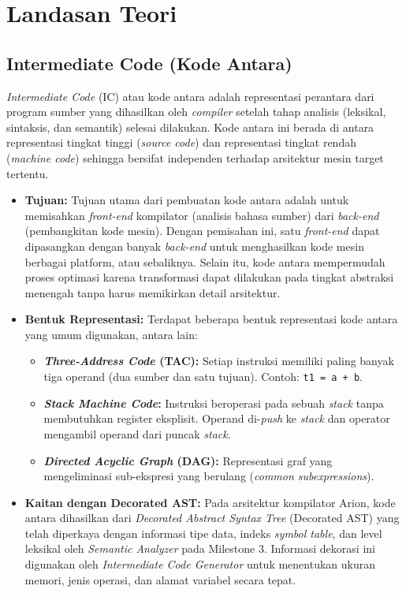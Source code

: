 \documentclass[12pt, a4paper]{article}
\begin{document}

\section{Landasan Teori}

\subsection{Intermediate Code (Kode Antara)}
\textit{Intermediate Code} (IC) atau kode antara adalah representasi perantara dari program sumber yang dihasilkan oleh \textit{compiler} setelah tahap analisis (leksikal, sintaksis, dan semantik) selesai dilakukan. Kode antara ini berada di antara representasi tingkat tinggi (\textit{source code}) dan representasi tingkat rendah (\textit{machine code}) sehingga bersifat independen terhadap arsitektur mesin target tertentu.

\begin{itemize}
    \item \textbf{Tujuan:} Tujuan utama dari pembuatan kode antara adalah untuk memisahkan \textit{front-end} kompilator (analisis bahasa sumber) dari \textit{back-end} (pembangkitan kode mesin). Dengan pemisahan ini, satu \textit{front-end} dapat dipasangkan dengan banyak \textit{back-end} untuk menghasilkan kode mesin berbagai platform, atau sebaliknya. Selain itu, kode antara mempermudah proses optimasi karena transformasi dapat dilakukan pada tingkat abstraksi menengah tanpa harus memikirkan detail arsitektur.
    \item \textbf{Bentuk Representasi:} Terdapat beberapa bentuk representasi kode antara yang umum digunakan, antara lain:
    \begin{itemize}
        \item \textbf{\textit{Three-Address Code} (TAC):} Setiap instruksi memiliki paling banyak tiga operand (dua sumber dan satu tujuan). Contoh: \texttt{t1 = a + b}.
        \item \textbf{\textit{Stack Machine Code}:} Instruksi beroperasi pada sebuah \textit{stack} tanpa membutuhkan register eksplisit. Operand di-\textit{push} ke \textit{stack} dan operator mengambil operand dari puncak \textit{stack}.
        \item \textbf{\textit{Directed Acyclic Graph} (DAG):} Representasi graf yang mengeliminasi sub-ekspresi yang berulang (\textit{common subexpressions}).
    \end{itemize}
    \item \textbf{Kaitan dengan Decorated AST:} Pada arsitektur kompilator Arion, kode antara dihasilkan dari \textit{Decorated Abstract Syntax Tree} (Decorated AST) yang telah diperkaya dengan informasi tipe data, indeks \textit{symbol table}, dan level leksikal oleh \textit{Semantic Analyzer} pada Milestone 3. Informasi dekorasi ini digunakan oleh \textit{Intermediate Code Generator} untuk menentukan ukuran memori, jenis operasi, dan alamat variabel secara tepat.
\end{itemize}
\end{document}
